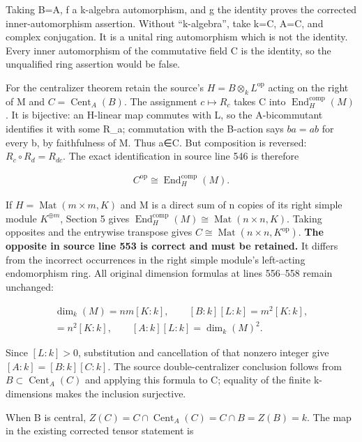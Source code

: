 \documentclass[11pt]{article}
\begin{document}
Taking B=A, f a k-algebra automorphism, and g the identity proves the corrected inner-automorphism assertion. Without ``k-algebra'', take k=C, A=C, and complex conjugation. It is a unital ring automorphism which is not the identity. Every inner automorphism of the commutative field C is the identity, so the unqualified ring assertion would be false.

For the centralizer theorem retain the source's \(H=B\otimes _{k} L^{\mathrm{op}}\) acting on the right of M and \(C=\operatorname{Cent}_{A}(B)\). The assignment \(c\mapsto R_{c}\) takes C into \(\operatorname{End}_{H}^{\mathrm{comp}}(M)\). It is bijective: an H-linear map commutes with L, so the A-bicommutant identifies it with some R\_a; commutation with the B-action says \(ba=ab\) for every b, by faithfulness of M. Thus a∈C. But composition is reversed: \(R_{c}\circ R_{d}=R_{dc}\). The exact identification in source line 546 is therefore

\[\begin{gathered}
C^{\mathrm{op}} \cong \operatorname{End}_{H}^{\mathrm{comp}}(M).
\end{gathered}\]

If \(H=\operatorname{Mat}(m\times m,K)\) and M is a direct sum of n copies of its right simple module \(K^{\oplus m}\), Section 5 gives \(\operatorname{End}_{H}^{\mathrm{comp}}(M)\cong \operatorname{Mat}(n\times n,K)\). Taking opposites and the entrywise transpose gives \(C\cong \operatorname{Mat}(n\times n,K^{\mathrm{op}})\). \textbf{The opposite in source line 553 is correct and must be retained.} It differs from the incorrect occurrences in the right simple module's left-acting endomorphism ring. All original dimension formulas at lines 556--558 remain unchanged:

\[\begin{gathered}
\operatorname{dim}_{k}(M)=nm[K:k],\qquad [B:k][L:k]=m^{2}[K:k],\\[C:k]=n^{2}[K:k],\qquad [A:k][L:k]=\operatorname{dim}_{k}(M)^{2}.
\end{gathered}\]

Since \([L:k]>0\), substitution and cancellation of that nonzero integer give \([A:k]=[B:k][C:k]\). The source double-centralizer conclusion follows from \(B\subset \operatorname{Cent}_{A}(C)\) and applying this formula to C; equality of the finite k-dimensions makes the inclusion surjective.

When B is central, \(Z(C)=C\cap \operatorname{Cent}_{A}(C)=C\cap B=Z(B)=k\). The map in the existing corrected tensor statement is
\end{document}
